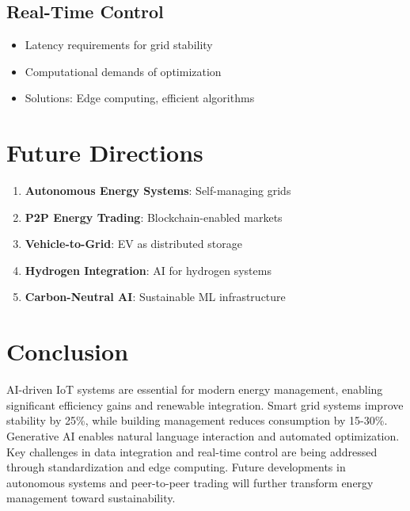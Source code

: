 \documentclass[12pt,a4paper]{article}
\begin{document}
\subsection{Real-Time Control}

\begin{itemize}
    \item Latency requirements for grid stability
    \item Computational demands of optimization
    \item Solutions: Edge computing, efficient algorithms
\end{itemize}

\section{Future Directions}

\begin{enumerate}
    \item \textbf{Autonomous Energy Systems}: Self-managing grids
    \item \textbf{P2P Energy Trading}: Blockchain-enabled markets
    \item \textbf{Vehicle-to-Grid}: EV as distributed storage
    \item \textbf{Hydrogen Integration}: AI for hydrogen systems
    \item \textbf{Carbon-Neutral AI}: Sustainable ML infrastructure
\end{enumerate}

\section{Conclusion}

AI-driven IoT systems are essential for modern energy management, enabling significant efficiency gains and renewable integration. Smart grid systems improve stability by 25\%, while building management reduces consumption by 15-30\%. Generative AI enables natural language interaction and automated optimization. Key challenges in data integration and real-time control are being addressed through standardization and edge computing. Future developments in autonomous systems and peer-to-peer trading will further transform energy management toward sustainability.
\end{document}
